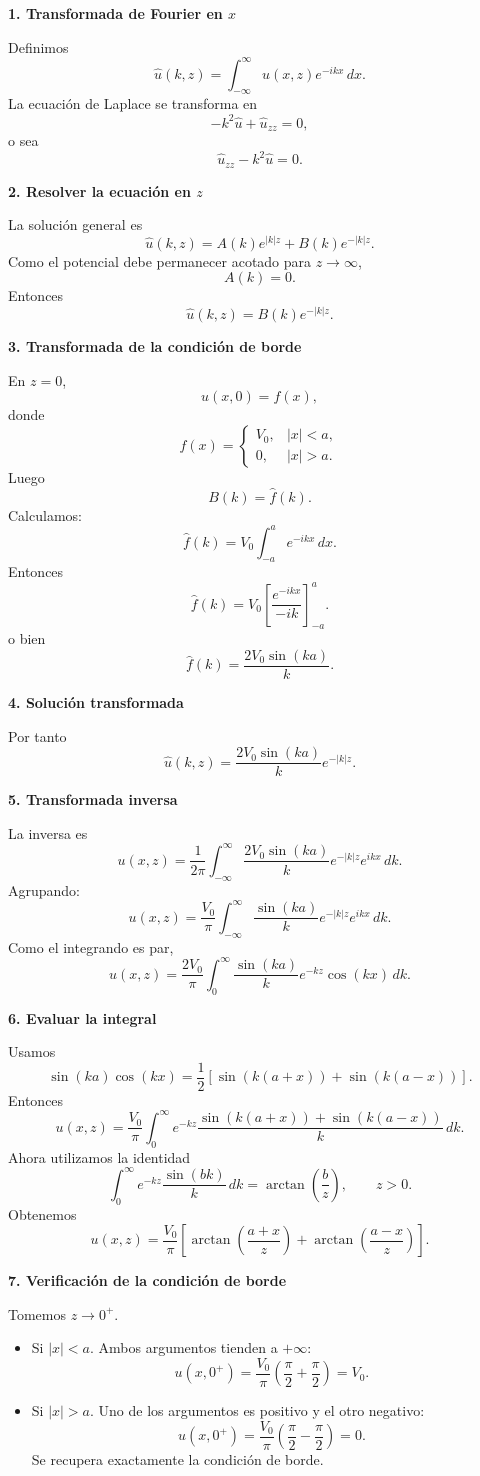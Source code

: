 \documentclass[11pt,spanish]{article}
\begin{document}
{\bf 1. Transformada de Fourier en $x$}

Definimos
$$
\hat u(k,z)
=
\int_{-\infty}^{\infty}
u(x,z)e^{-ikx}\,dx.
$$
La ecuación de Laplace se transforma en
$$
-k^2\hat u+\hat u_{zz}=0,
$$
o sea
$$
\boxed{
\hat u_{zz}-k^2\hat u=0.
}
$$

{\bf 2. Resolver la ecuación en $z$}

La solución general es
$$
\hat u(k,z)
=
A(k)e^{|k|z}
+
B(k)e^{-|k|z}.
$$
Como el potencial debe permanecer acotado para $z\to\infty$,
$$
A(k)=0.
$$
Entonces
$$
\boxed{
\hat u(k,z)=B(k)e^{-|k|z}.
}
$$

{\bf 3. Transformada de la condición de borde}

En $z=0$,
$$
u(x,0)=f(x),
$$
donde
$$
f(x)=
\begin{cases}
V_0,& |x|<a,\\
0,& |x|>a.
\end{cases}
$$
Luego
$$
B(k)=\hat f(k).
$$
Calculamos:
$$
\hat f(k)
=
V_0
\int_{-a}^{a}
e^{-ikx}\,dx.
$$
Entonces
$$
\hat f(k)
=
V_0
\left[
\frac{e^{-ikx}}{-ik}
\right]_{-a}^{a}.
$$
o bien
$$
\boxed{
\hat f(k)
=
\frac{2V_0\sin(ka)}{k}.
}
$$

{\bf 4. Solución transformada}

Por tanto
$$
\boxed{
\hat u(k,z)
=
\frac{2V_0\sin(ka)}{k}
e^{-|k|z}.
}
$$

{\bf 5. Transformada inversa}

La inversa es
$$
u(x,z)
=
\frac1{2\pi}
\int_{-\infty}^{\infty}
\frac{2V_0\sin(ka)}{k}
e^{-|k|z}
e^{ikx}
\,dk.
$$
Agrupando:
$$
u(x,z)
=
\frac{V_0}{\pi}
\int_{-\infty}^{\infty}
\frac{\sin(ka)}{k}
e^{-|k|z}
e^{ikx}
\,dk.
$$
Como el integrando es par,
$$
u(x,z)
=
\frac{2V_0}{\pi}
\int_0^\infty
\frac{\sin(ka)}{k}
e^{-kz}
\cos(kx)
\,dk.
$$

{\bf 6. Evaluar la integral}

Usamos
$$
\sin(ka)\cos(kx)
=
\frac12
\left[
\sin(k(a+x))
+
\sin(k(a-x))
\right].
$$
Entonces
$$
u(x,z)
=
\frac{V_0}{\pi}
\int_0^\infty
e^{-kz}
\frac{
\sin(k(a+x))
+
\sin(k(a-x))
}{k}
\,dk.
$$
Ahora utilizamos la identidad
$$
\int_0^\infty
e^{-kz}
\frac{\sin(bk)}{k}
\,dk
=
\arctan\left(\frac{b}{z}\right),
\qquad z>0.
$$
Obtenemos
$$
\boxed{
u(x,z)
=
\frac{V_0}{\pi}
\left[
\arctan\left(\frac{a+x}{z}\right)
+
\arctan\left(\frac{a-x}{z}\right)
\right].
}
$$

{\bf 7. Verificación de la condición de borde}

Tomemos $z\to0^+$.
\begin{itemize}
\item Si $|x|<a$.
Ambos argumentos tienden a $+\infty$:
$$
u(x,0^+)
=
\frac{V_0}{\pi}
\left(
\frac{\pi}{2}
+
\frac{\pi}{2}
\right)
=
V_0.
$$

\item Si $|x|>a$.
Uno de los argumentos es positivo y el otro negativo:
$$
u(x,0^+)
=
\frac{V_0}{\pi}
\left(
\frac{\pi}{2}
-
\frac{\pi}{2}
\right)
=
0.
$$
Se recupera exactamente la condición de borde.
\end{itemize}
\end{document}
